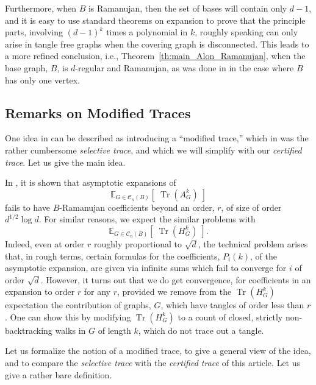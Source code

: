 \documentclass{memo-l}
\theoremstyle{plain}
\theoremstyle{definition}
\numberwithin{section}{chapter}
\numberwithin{equation}{chapter}
\newcommand{\expect}[2]{{\mathbb{E}}_{#1}{\left[\; #2\; \right]}}
\DeclareMathOperator{\Tr}{Tr}
\theoremstyle{plain}
\theoremstyle{definition}
\newcommand\cC{\mathcal{C}}
\begin{document}
{Furthermore, when $B$ is Ramanujan, then the set of bases will
contain only $d-1$, and it is easy to use standard theorems on
expansion to prove that the principle parts, involving $(d-1)^k$
times a polynomial in $k$, roughly speaking can only arise in tangle
free graphs when the covering graph is disconnected.
This leads to a more refined conclusion, i.e.,
Theorem~\ref{th:main_Alon_Ramanujan}, when the base graph, $B$,
is $d$-regular and Ramanujan, as was done in \cite{friedman_alon}
in the case where $B$ has only one vertex.

\subsection{Remarks on Modified Traces}

One idea in \cite{friedman_alon} can be described as introducing
a ``modified trace,'' which in \cite{friedman_alon} was the
rather cumbersome
{\em selective trace}, and which we will simplify with our
{\em certified trace}.  Let us give the main idea.

In \cite{friedman_alon}, it is shown that asymptotic expansions of
$$
\expect{G\in\cC_n(B)}{\Tr(A_G^k) }
$$
fails to have $B$-Ramanujan coefficients beyond an order, $r$,
of size of order $d^{1/2}\log d$.  For similar reasons, we expect
the similar problems with
$$
\expect{G\in\cC_n(B)}{\Tr(H_G^k) }.
$$
Indeed, even at order $r$ roughly proportional to $\sqrt{d}$,
the technical problem arises that, in rough terms, certain formulas for the
coefficients, $P_i(k)$, of the asymptotic expansion, are given via
infinite sums which fail to converge for $i$ of order $\sqrt{d}$.
However, it turns out that we do get convergence, for coefficients in
an expansion to order $r$ for any $r$,
provided we remove from the $\Tr(H_G^k)$ expectation the contribution
of graphs, $G$, which have tangles of order less than $r$.
One can show this by modifying $\Tr(H_G^k)$ to a count of
closed, strictly non-backtracking walks in $G$ of length $k$,
which do not trace out a tangle.

Let us formalize the notion of a modified trace, to give a general
view of the idea, and to compare the {\em selective trace}
\cite{friedman_alon} with the {\em certified trace} of this article.
Let us give a rather bare definition.

}
\end{document}
